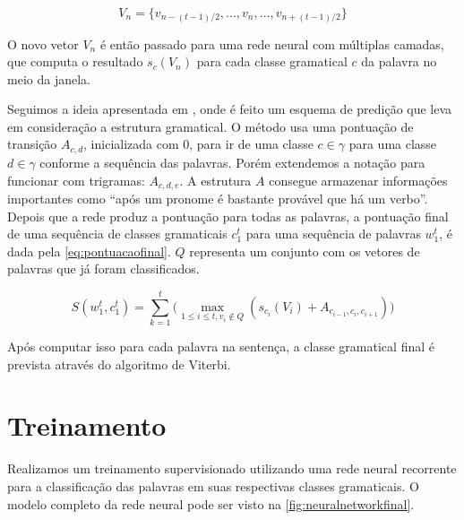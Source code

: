 \begin{equation} \label{eq:janeladevets}
V_n = \big\{ v_{n - (t-1)/2}, ..., v_n, ..., v_{{n + (t-1)/2}} \big\}
\end{equation}

O novo vetor $V_n$ é então passado para uma rede neural com múltiplas camadas, que computa o resultado $s_c(V_n)$ para cada classe gramatical $c$ da palavra no meio da janela. 

Seguimos a ideia apresentada em \cite{collobert2011natural}, onde é feito um esquema de predição que leva em consideração a estrutura gramatical. O método usa uma pontuação de transição $A_{c,d}$, inicializada com 0, para ir de uma classe $c \in \gamma$ para uma classe $d \in \gamma$ conforme a sequência das palavras. Porém extendemos a notação para funcionar com trigramas: $A_{c,d,e}$. A estrutura $A$ consegue armazenar informações importantes como ``após um pronome é bastante provável que há um verbo''. Depois que a rede produz a pontuação para todas as palavras, a pontuação final de uma sequência de classes gramaticais $c_1^t$ para uma sequência de palavras $w_1^t$, é dada pela \autoref{eq:pontuacaofinal}. $Q$ representa um conjunto com os vetores de palavras que já foram classificados.

\begin{equation} \label{eq:pontuacaofinal}
S(w_1^t, c_1^t) = \sum\limits_{k=1}^{t} \Big( \max_{1 \leq i \leq t, v_i \notin Q} (s_{c_i}(V_i) + A_{c_{i-1}, c_{i}, c_{i+1}}) \Big)
\end{equation}

Após computar isso para cada palavra na sentença, a classe gramatical final é prevista através do algoritmo de Viterbi.


\section{Treinamento}

Realizamos um treinamento supervisionado utilizando uma rede neural recorrente para a classificação das palavras em suas respectivas classes gramaticais. O modelo completo da rede neural pode ser visto na \autoref{fig:neuralnetworkfinal}.

